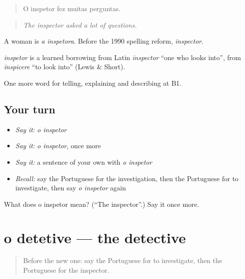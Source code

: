\begin{quote}
O inspetor fez muitas perguntas.
\end{quote}

\begin{quote}
\emph{The inspector asked a lot of questions.}
\end{quote}

A woman is \emph{a inspetora}. Before the 1990 spelling reform, \emph{inspector}.

\begin{cousinweb}
\emph{inspetor} is a learned borrowing from Latin \emph{īnspector} \textquotedblleft{}one who looks into\textquotedblright{}, from \emph{īnspicere} \textquotedblleft{}to look into\textquotedblright{} (Lewis \& Short).
\end{cousinweb}

\begin{grammarlens}[title={What you've built}]
One more word for telling, explaining and describing at B1.
\end{grammarlens}

\subsection*{Your turn}
\begin{itemize}
\raggedright
  \item \emph{Say it:} \emph{o inspetor}
  \item \emph{Say it:} \emph{o inspetor}, once more
  \item \emph{Say it:} a sentence of your own with \emph{o inspetor}
  \item \emph{Recall:} say the Portuguese for the investigation, then the Portuguese for to investigate, then say \emph{o inspetor} again
\end{itemize}

\begin{tcolorbox}[breakable,colback=teal!4,colframe=teal!35!black,title={Before you move on}]
What does o inspetor mean? (\textquotedblleft{}The inspector\textquotedblright{}.) Say it once more.
\end{tcolorbox}
\section[o detetive]{o detetive — the detective}

\label{lesson:PT-C294-detetive}



\begin{quote}
Before the new one: say the Portuguese for to investigate, then the Portuguese for the inspector.
\end{quote}

